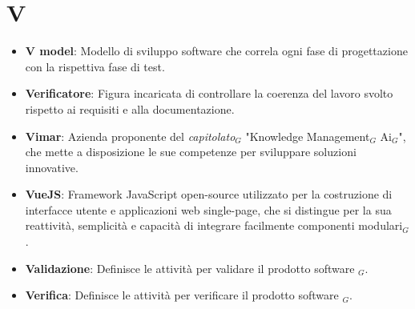 \section{V}
\begin{itemize}
    \item \textbf{V model}: Modello di sviluppo software che correla ogni fase di progettazione con la rispettiva fase di test.
    \item \textbf{Verificatore}: Figura incaricata di controllare la coerenza del lavoro svolto rispetto ai requisiti e alla documentazione.
    \item \textbf{Vimar}: Azienda proponente del \textit{capitolato}$_G$ "Knowledge Management$_G$ Ai$_G$", che mette a disposizione le sue competenze per sviluppare soluzioni innovative.
    \item \textbf{VueJS}: Framework JavaScript open-source utilizzato per la costruzione di interfacce utente e applicazioni web single-page, che si distingue per la sua reattività, semplicità e capacità di integrare facilmente componenti modulari$_G$.
    \item \textbf{Validazione}: Definisce le attività per validare il prodotto software $_G$. \item \textbf{Verifica}: Definisce le attività per verificare il prodotto software $_G$.
\end{itemize}
